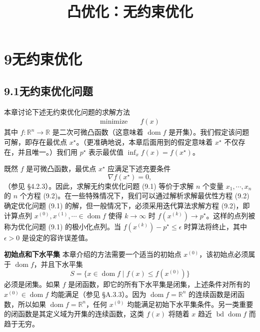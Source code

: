 \documentclass[UTF8, 12pt, fontset=fandol, oneside]{ctexart}
\title{凸优化：无约束优化}
\author{}
\date{}
\begin{document}
\maketitle

\section*{9\quad 无约束优化}

\subsection*{9.1\quad 无约束优化问题}

本章讨论下述无约束优化问题的求解方法
\begin{equation}
\begin{aligned}
\text{minimize}\quad & f(x)
\end{aligned}
\tag{9.1}
\end{equation}
其中 $f:\mathbb{R}^n\to\mathbb{R}$ 是二次可微凸函数（这意味着 $\operatorname{dom} f$ 是开集）。我们假定该问题可解，即存在最优点 $x^\star$。（更准确地说，本章后面用到的假定意味着 $x^\star$ 不仅存在，并且唯一。）我们用 $p^\star$ 表示最优值 $\inf_x f(x)=f(x^\star)$。

既然 $f$ 是可微凸函数，最优点 $x^\star$ 应满足下述充要条件
\begin{equation}
\nabla f(x^\star)=0,
\tag{9.2}
\end{equation}
（参见 \S4.2.3）。因此，求解无约束优化问题 (9.1) 等价于求解 $n$ 个变量 $x_1,\cdots,x_n$ 的 $n$ 个方程 (9.2)。在一些特殊情况下，我们可以通过解析求解最优性方程 (9.2) 确定优化问题 (9.1) 的解，但一般情况下，必须采用迭代算法求解方程 (9.2)，即计算点列 $x^{(0)},x^{(1)},\cdots\in\operatorname{dom} f$ 使得 $k\to\infty$ 时 $f(x^{(k)})\to p^\star$。这样的点列被称为优化问题 (9.1) 的极小化点列。当 $f(x^{(k)})-p^\star\leq \epsilon$ 时算法将终止，其中 $\epsilon>0$ 是设定的容许误差值。

\noindent\textbf{初始点和下水平集}\quad
本章介绍的方法需要一个适当的初始点 $x^{(0)}$，该初始点必须属于 $\operatorname{dom} f$，并且下水平集
\begin{equation}
S=\{x\in\operatorname{dom} f\mid f(x)\leq f(x^{(0)})\}
\tag{9.3}
\end{equation}
必须是闭集。如果 $f$ 是闭函数，即它的所有下水平集是闭集，上述条件对所有的 $x^{(0)}\in\operatorname{dom} f$ 均能满足（参见 \S A.3.3）。因为 $\operatorname{dom} f=\mathbb{R}^n$ 的连续函数是闭函数，所以如果 $\operatorname{dom} f=\mathbb{R}^n$，任何 $x^{(0)}$ 均能满足初始下水平集条件。另一类重要的闭函数是其定义域为开集的连续函数，这类 $f(x)$ 将随着 $x$ 趋近 $\operatorname{bd}\operatorname{dom} f$ 而趋于无穷。
\end{document}
